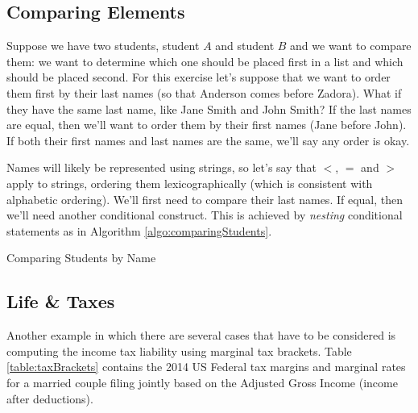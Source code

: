 %

\subsection{Comparing Elements}

Suppose we have two students, student $A$ and student $B$ and we want to compare 
them: we want to determine which one should be placed first in a list and which should
be placed second.  For this exercise let's suppose that we want to order them first by
their last names (so that Anderson comes before Zadora).  What if they have the same
last name, like Jane Smith and John Smith?  If the last names are equal, then we'll want
to order them by their first names (Jane before John).  If both their first names and last
names are the same, we'll say any order is okay.

Names will likely be represented using strings, so let's say that $<$, $=$ and $>$ apply
to strings, ordering them lexicographically (which is consistent with alphabetic ordering).
We'll first need to compare their last names.  If equal, then we'll need another conditional
construct.  This is achieved by \emph{nesting} conditional statements as in Algorithm 
\ref{algo:comparingStudents}.


\begin{algorithm}[H]
\caption{Comparing Students by Name}
\label{algo:comparingStudents}
\end{algorithm}

\subsection{Life \& Taxes}
\label{subsubsection:lifeAndTaxes}

Another example in which there are several cases that have to be considered is computing the 
income tax liability using marginal tax brackets.  Table \ref{table:taxBrackets}
contains the 2014 US Federal tax margins and marginal rates for a married couple filing jointly based
on the Adjusted Gross Income (income after deductions).

